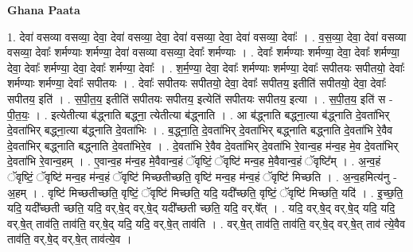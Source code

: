 \documentclass[17pt]{extarticle}
\begin{document}
\textbf{Ghana Paata } \newline

1. देवा॑ वसव्या वसव्या॒ देवा॒ देवा॑ वसव्या॒ देवा॒ देवा॑ वसव्या॒ देवा॒ देवा॑ वसव्या॒ देवाः᳚ । . व॒स॒व्या॒ देवा॒ देवा॑ वसव्या वसव्या॒ देवाः᳚ शर्मण्याः शर्मण्या॒ देवा॑ वसव्या वसव्या॒ देवाः᳚ शर्मण्याः । . देवाः᳚ शर्मण्याः शर्मण्या॒ देवा॒ देवाः᳚ शर्मण्या॒ देवा॒ देवाः᳚ शर्मण्या॒ देवा॒ देवाः᳚ शर्मण्या॒ देवाः᳚ । . श॒र्म॒ण्या॒ देवा॒ देवाः᳚ शर्मण्याः शर्मण्या॒ देवाः᳚ सपीतयः सपीतयो॒ देवाः᳚ शर्मण्याः शर्मण्या॒ देवाः᳚ सपीतयः । . देवाः᳚ सपीतयः सपीतयो॒ देवा॒ देवाः᳚ सपीतय॒ इतीति॑ सपीतयो॒ देवा॒ देवाः᳚ सपीतय॒ इति॑ । . स॒पी॒त॒य॒ इतीति॑ सपीतयः सपीतय॒ इत्येति॑ सपीतयः सपीतय॒ इत्या । . स॒पी॒त॒य॒ इति॑ स - पी॒त॒यः॒ । . इत्येतीत्या ब॑द्ध्नाति बद्ध्ना॒ त्येतीत्या ब॑द्ध्नाति । . आ ब॑द्ध्नाति बद्ध्ना॒त्या ब॑द्ध्नाति दे॒वता॑भिर् दे॒वता॑भिर् बद्ध्ना॒त्या ब॑द्ध्नाति दे॒वता॑भिः । . ब॒द्ध्ना॒ति॒ दे॒वता॑भिर् दे॒वता॑भिर् बद्ध्नाति बद्ध्नाति दे॒वता॑भि रे॒वैव दे॒वता॑भिर् बद्ध्नाति बद्ध्नाति दे॒वता॑भिरे॒व । . दे॒वता॑भि रे॒वैव दे॒वता॑भिर् दे॒वता॑भि रे॒वान्व॒ह म॑न्व॒ह मे॒व दे॒वता॑भिर् दे॒वता॑भि रे॒वान्व॒हम् । . ए॒वान्व॒ह म॑न्व॒ह मे॒वैवान्व॒हं ॅवृष्टिं॒ ॅवृष्टि॑ मन्व॒ह मे॒वैवान्व॒हं ॅवृष्टि᳚म् । . अ॒न्व॒हं ॅवृष्टिं॒ ॅवृष्टि॑ मन्व॒ह म॑न्व॒हं ॅवृष्टि॑ मिच्छतीच्छति॒ वृष्टि॑ मन्व॒ह म॑न्व॒हं ॅवृष्टि॑ मिच्छति । . अ॒न्व॒हमित्य॑नु - अ॒हम् । . वृष्टि॑ मिच्छतीच्छति॒ वृष्टिं॒ ॅवृष्टि॑ मिच्छति॒ यदि॒ यदी᳚च्छति॒ वृष्टिं॒ ॅवृष्टि॑ मिच्छति॒ यदि॑ । . इ॒च्छ॒ति॒ यदि॒ यदी᳚च्छती च्छति॒ यदि॒ वर्.षे॒द् वर्.षे॒द् यदी᳚च्छती च्छति॒ यदि॒ वर्.षे᳚त् । . यदि॒ वर्.षे॒द् वर्.षे॒द् यदि॒ यदि॒ वर्.षे॒त् ताव॑ति॒ ताव॑ति॒ वर्.षे॒द् यदि॒ यदि॒ वर्.षे॒त् ताव॑ति । . वर्.षे॒त् ताव॑ति॒ ताव॑ति॒ वर्.षे॒द् वर्.षे॒त् ताव॑ त्ये॒वैव ताव॑ति॒ वर्.षे॒द् वर्.षे॒त् ताव॑त्ये॒व । \newline
\end{document}
